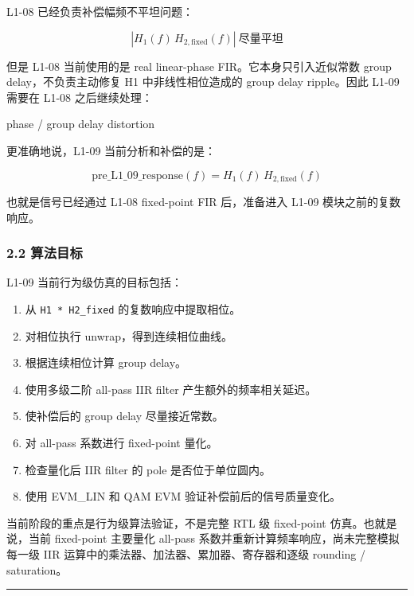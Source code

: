 \documentclass[
]{ctexart}
\newenvironment{Shaded}{}{}
\newcommand{\NormalTok}[1]{#1}
\providecommand{\tightlist}{%
  \setlength{\itemsep}{0pt}\setlength{\parskip}{0pt}}
\begin{document}
L1-08 已经负责补偿幅频不平坦问题：

\[
\left|H_1(f)\,H_{2,\mathrm{fixed}}(f)\right|\ \text{尽量平坦}
\]

但是 L1-08 当前使用的是 real linear-phase FIR。它本身只引入近似常数
group delay，不负责主动修复 H1 中非线性相位造成的 group delay
ripple。因此 L1-09 需要在 L1-08 之后继续处理：

\begin{Shaded}
\begin{Highlighting}[]
\NormalTok{phase / group delay distortion}
\end{Highlighting}
\end{Shaded}

更准确地说，L1-09 当前分析和补偿的是：

\[
\mathrm{pre\_L1\_09\_response}(f)=H_1(f)\,H_{2,\mathrm{fixed}}(f)
\]

也就是信号已经通过 L1-08 fixed-point FIR 后，准备进入 L1-09
模块之前的复数响应。

\subsubsection{2.2 算法目标}\label{ux7b97ux6cd5ux76eeux6807}

L1-09 当前行为级仿真的目标包括：

\begin{enumerate}
\def\labelenumi{\arabic{enumi}.}
\tightlist
\item
  从 \texttt{H1\ *\ H2\_fixed} 的复数响应中提取相位。
\item
  对相位执行 unwrap，得到连续相位曲线。
\item
  根据连续相位计算 group delay。
\item
  使用多级二阶 all-pass IIR filter 产生额外的频率相关延迟。
\item
  使补偿后的 group delay 尽量接近常数。
\item
  对 all-pass 系数进行 fixed-point 量化。
\item
  检查量化后 IIR filter 的 pole 是否位于单位圆内。
\item
  使用 EVM\_LIN 和 QAM EVM 验证补偿前后的信号质量变化。
\end{enumerate}

当前阶段的重点是行为级算法验证，不是完整 RTL 级 fixed-point
仿真。也就是说，当前 fixed-point 主要量化 all-pass
系数并重新计算频率响应，尚未完整模拟每一级 IIR
运算中的乘法器、加法器、累加器、寄存器和逐级 rounding / saturation。

\begin{center}\rule{0.5\linewidth}{0.5pt}\end{center}
\end{document}
